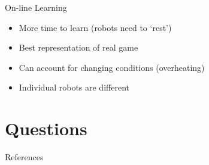 \documentclass{beamer}
\begin{document}
\begin{frame}{On-line Learning}
\begin{itemize}
\item More time to learn (robots need to `rest')
\item Best representation of real game
\item Can account for changing conditions (overheating)
\item Individual robots are different
\end{itemize}
\end{frame}

\section{Questions}

\begin{frame}{References}
	
	
\end{frame}
\end{document}
